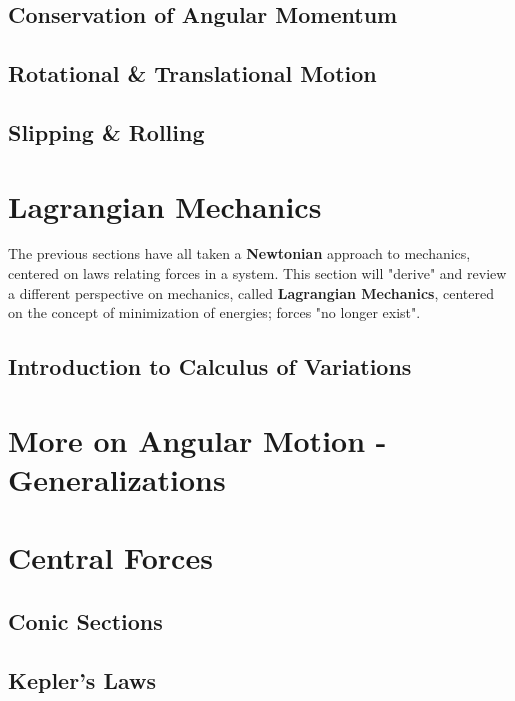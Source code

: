 \documentclass[12pt]{article}
\begin{document}

\subsection{Conservation of Angular Momentum}


\subsection{Rotational \& Translational Motion}

\subsection{Slipping \& Rolling}

\section{Lagrangian Mechanics}

The previous sections have all taken a \textbf{Newtonian} approach to mechanics, centered on laws relating forces in a system. This section will "derive" and review a different perspective on mechanics, called \textbf{Lagrangian Mechanics}, centered on the concept of minimization of energies; forces "no longer exist".
\subsection{Introduction to Calculus of Variations}


\section{More on Angular Motion - Generalizations}

\section{Central Forces}

\subsection{Conic Sections}
\subsection{Kepler's Laws}
\end{document}
